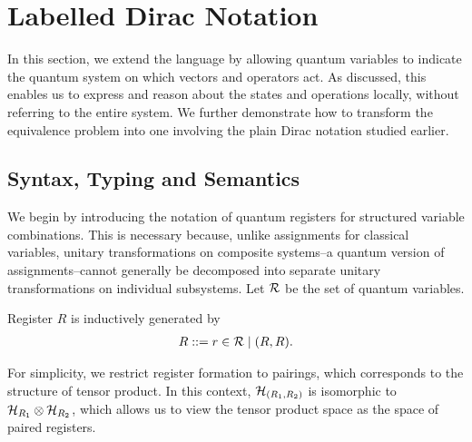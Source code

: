 
\newcommand {\cD } {{\mathcal{D}}}
\newcommand {\cl } {{\mathit{cl}}}


\section{Labelled Dirac Notation}
\label{sec: labelled}









In this section, we extend the language by allowing quantum variables to indicate the quantum system on which vectors and operators act. 
As discussed, this enables us to express and reason about the states and operations locally, without referring to the entire system. 
We further demonstrate how to transform the equivalence problem into one involving the plain Dirac notation studied earlier.

\subsection{Syntax, Typing and Semantics}
We begin by introducing the notation of quantum registers for structured variable combinations. This is necessary because, unlike assignments for classical variables, unitary transformations on composite systems--a quantum version of assignments--cannot generally be decomposed into separate unitary transformations on individual subsystems.
Let $\mathcal{R}$ be the set of quantum variables.
\begin{definition} Register $R$ is inductively generated by
  \begin{align*}
    R ::= r\in\mathcal{R} \mid (R, R).
  \end{align*}
\end{definition}
For simplicity, we restrict register formation to pairings, which corresponds to the structure of tensor product. In this context, ${\mathcal{H}}_{(R_1,R_2)}$ is isomorphic to ${\mathcal{H}}_{R_1}\otimes {\mathcal{H}}_{R_2}$, which allows us to view the tensor product space as the space of paired registers.

